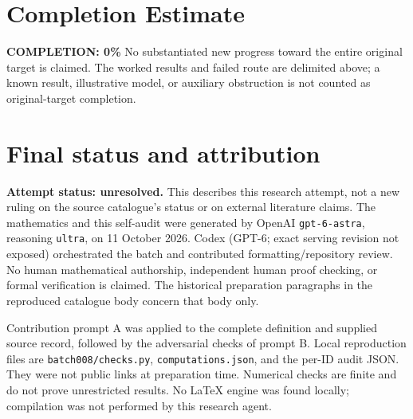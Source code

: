 \documentclass[11pt]{article}
\begin{document}
\section{Completion Estimate}
\noindent\textbf{COMPLETION: 0\%}
No substantiated new progress toward the entire original target is claimed. The worked results and failed route are delimited above; a known result, illustrative model, or auxiliary obstruction is not counted as original-target completion.

\section{Final status and attribution}
\textbf{Attempt status: unresolved.} This describes this research attempt, not a new ruling on the source catalogue's status or on external literature claims.
The mathematics and this self-audit were generated by OpenAI \texttt{gpt-6-astra}, reasoning \texttt{ultra}, on 11 October 2026. Codex (GPT-6; exact serving revision not exposed) orchestrated the batch and contributed formatting/repository review. No human mathematical authorship, independent human proof checking, or formal verification is claimed. The historical preparation paragraphs in the reproduced catalogue body concern that body only.

Contribution prompt A was applied to the complete definition and supplied source record, followed by the adversarial checks of prompt B. Local reproduction files are \texttt{batch008/checks.py}, \texttt{computations.json}, and the per-ID audit JSON. They were not public links at preparation time. Numerical checks are finite and do not prove unrestricted results. No LaTeX engine was found locally; compilation was not performed by this research agent.
\end{document}
